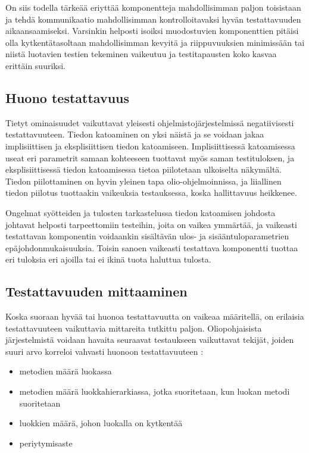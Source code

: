 \documentclass[finnish]{tktltiki2}
\theoremstyle{definition}
\theoremstyle{remark}
\begin{document}
On siis todella tärkeää eriyttää komponentteja mahdollisimman paljon toisistaan ja tehdä kommunikaatio mahdollisimman kontrolloitavaksi hyvän testattavuuden aikaansaamiseksi. Varsinkin helposti isoiksi muodostuvien komponenttien pitäisi olla kytkentätasoltaan mahdollisimman kevyitä ja riippuvuuksien minimissään tai niistä luotavien testien tekeminen vaikeutuu ja testitapausten koko kasvaa erittäin suuriksi.



\subsection{Huono testattavuus}

Tietyt ominaisuudet vaikuttavat yleisesti ohjelmistojärjestelmissä negatiivisesti testattavuuteen. Tiedon katoaminen on yksi näistä \citep{Voas:1995:STN:624607.625469} ja se voidaan jakaa implisiittisen ja eksplisiittisen tiedon katoamiseen. Implisiittisessä katoamisessa useat eri parametrit samaan kohteeseen tuottavat myös saman testituloksen, ja eksplisiittisessä tiedon katoamisessa tietoa piilotetaan ulkoiselta näkymältä. Tiedon piilottaminen on hyvin yleinen tapa olio-ohjelmoinnissa, ja liiallinen tiedon piilotus tuottaakin vaikeuksia testauksessa, koska hallittavuus heikkenee. 

Ongelmat syötteiden ja tulosten tarkastelussa tiedon katoamisen johdosta johtavat helposti tarpeettomiin testeihin, joita on vaikea ymmärtää, ja vaikeasti testattavan komponentin voidaankin sisältävän ulos- ja sisääntuloparametrien epäjohdonmukaisuuksia. Toisin sanoen vaikeasti testattava komponentti tuottaa eri tuloksia eri ajoilla tai ei ikinä tuota haluttua tulosta.   




\subsection{Testattavuuden mittaaminen} \label{testability_measure}


Koska suoraan hyvää tai huonoa testattavuutta on vaikeaa määritellä, on erilaisia testattavuuteen vaikuttavia mittareita tutkittu paljon. Oliopohjaisista järjestelmistä voidaan havaita seuraavat testaukseen vaikuttavat tekijät, joiden suuri arvo korreloi vahvasti huonoon testattavuuteen \citep{Dubey:2011:AMM:2020976.2020983}:

\begin{itemize}
	\item metodien määrä luokassa
	\item metodien määrä luokkahierarkiassa, jotka suoritetaan, kun luokan metodi suoritetaan
	\item luokkien määrä, johon luokalla on kytkentää
	\item periytymisaste
\end{itemize}
\end{document}
